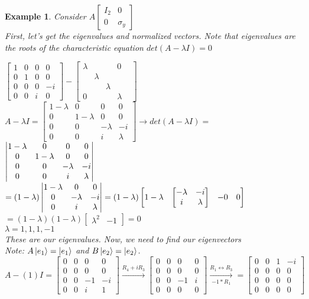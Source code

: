 \documentclass[12pt]{article}
\theoremstyle{plain}
\theoremstyle{nonumberplain}
\theoremstyle{plain}
\newtheorem{example}[lemma]{Example}
\theoremstyle{nonumberplain}
\newcommand\1{{\bf 1}}
\newcommand{\bmat}[1]{\begin{bmatrix*} #1 \end{bmatrix*}} %
\newcommand{\<}{\left\langle}
\renewcommand{\>}{\right\rangle}
\begin{document}
\begin{example}
Consider $A\bmat{I_2 & 0 \\ 0 & \sigma_y}$ \\ First, let's get the eigenvalues and normalized vectors. Note that eigenvalues are the \textit{roots} of the characteristic equation $det(A-\lambda I)=0$
\begin{center}
$\bmat{1 & 0 & 0 & 0 \\ 0 & 1 & 0 & 0 \\ 0 & 0 & 0 &-i \\ 0 & 0 & i & 0}-\bmat{\lambda & & & 0 \\ & \lambda & & & \\ & & \lambda & & \\ 0 & & & \lambda &}$ \\
$A-\lambda I=\bmat{1 - \lambda & 0 & 0 & 0 \\ 0 & 1-\lambda & 0 & 0 \\ 0 & 0 & -\lambda & -i \\ 0 & 0 & i & \lambda}\longrightarrow det(A-\lambda I)=$
$\begin{vmatrix}
1 - \lambda & 0 & 0 & 0 \\ 
0 & 1-\lambda & 0 & 0 \\ 
0 & 0 & -\lambda & -i \\ 
0 & 0 & i & \lambda \notag
\end{vmatrix}$ \\
$=(1-\lambda)\begin{vmatrix}
1-\lambda & 0 & 0 \\ 
0 & -\lambda & -i \\ 
0 & i & \lambda \notag
\end{vmatrix}=(1-\lambda)\bmat{1-\lambda & \bmat{-\lambda & -i \\ i & \lambda} & -0 & 0}$ \\
$=(1-\lambda)(1-\lambda)\bmat{\lambda^2 & -1}=0$ \\
$\lambda=1,1,1,-1$ \\
These are our eigenvalues. Now, we need to find our eigenvectors\\
Note: $A\ket{e_1}=\ket{e_1}$ and $B\ket{e_2}=\ket{e_2}$. \\
$A-(1)I=\bmat{0 & 0 & 0 & 0 \\ 0 & 0 & 0 & 0 \\ 0 & 0 & -1 & -i \\ 0 & 0 & i & 1}\xrightarrow{R_4+iR_3}\bmat{0 & 0 & 0 & 0 \\ 0 & 0 & 0 & 0 \\ 0 & 0 & -1 & i \\ 0 & 0 & 0 & 0}\xrightarrow[-1*R_1]{R_1\leftrightarrow R_3}=\bmat{0 & 0 & 1 & -i \\ 0 & 0 & 0 & 0 \\ 0 & 0 & 0 & 0 \\ 0 & 0 & 0 & 0}$ \\

\end{center}
\end{example}
\end{document}
